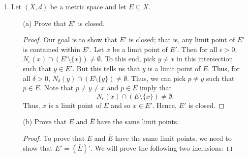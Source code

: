 \documentclass[a4paper]{article}
\begin{document}
\begin{enumerate}
\begin{enumerate}
\begin{proof}
                Now, with (2), let \( x \in (A \cup B)' \). Then \( x  \) is a limit point of \( A \cup  B \). Thus, for all \( \epsilon > 0 \) we have
                \[  {N}_{\epsilon}(x) \cap ((A \cup B) \setminus  \{ x \} ) \neq \emptyset. \]
                Pick a point in this intersection, say, \( p \neq x   \). Note that \( p \in A \cup B  \). So, either \( p \in A  \) or \( p \in B  \). If \( p \in A  \), then \( x  \) is a limit point of \( A  \). Thus, \( x \in A' \) and so \( x \in A' \cup B' \). If \( p \in B  \), then \( x  \) is a limit point of \( B  \) and so \( x \in B' \). Thus, \( x \in A' \cup B' \). Therefore, we have \( (A \cup B)' \subseteq A' \cup B' \) which proves (2). 

                With (1) and (2), we have 
                \[  A' \cup B' = (A \cup B)'. \]
                \end{proof}
        \end{enumerate}
    \item Let \( (X,d) \) be a metric space and let \( E \subseteq X  \).
        \begin{enumerate}
            \item[(a)] Prove that \( E' \) is closed.
                \begin{proof}
                Our goal is to show that \( E' \) is closed; that is, any limit point of \( E'  \) is contained within \( E' \). Let \( x  \) be a limit point of \( E'  \). Then for all \( \epsilon > 0 \), \( {N}_{\epsilon}(x) \cap (E' \setminus  \{ x \} )  \neq \emptyset  \). To this end, pick \( y \neq x  \) in this intersection such that \( y \in E' \). But this tells us that \( y  \) is a limit point of \( E  \). Thus, for all \( \delta > 0  \), \( {N}_{\delta}(y) \cap (E \setminus  \{ y \} ) \neq \emptyset \). Thus, we can pick \( p \neq y  \) such that \( p \in E  \). Note that \( p \neq y \neq x  \) and \( p \in E  \) imply that  
                \[  {N}_{\epsilon}(x) \cap (E \setminus  \{ x \} ) \neq \emptyset. \]
                Thus, \( x  \) is a limit point of \( E  \) and so \( x \in E' \). Hence, \( E' \) is closed.
                \end{proof}
            \item[(b)] Prove that \( E  \) and \( \overline{E} \) have the same limit points.
                \begin{proof}
                To prove that \( E  \) and \( \overline{E} \) have the same limit points, we need to show that \( E' = (\overline{E})' \). We will prove the following two inclusions:

\end{proof}
\end{enumerate}
\end{enumerate}
\end{document}
